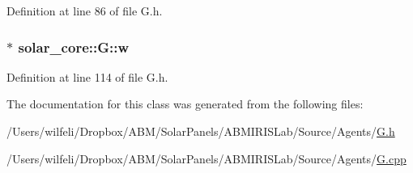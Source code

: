 Definition at line 86 of file G.\+h.

\hypertarget{classsolar__core_1_1_g_a7239d05d617261f97c46b641a0229c14}{}
\subsubsection[{w}]{$\ast$ solar\+\_\+core\+::\+G\+::w\hspace{0.3cm}{\ttfamily [protected]}}\label{classsolar__core_1_1_g_a7239d05d617261f97c46b641a0229c14}


Definition at line 114 of file G.\+h.



The documentation for this class was generated from the following files\+:\begin{DoxyCompactItemize}
\item 
/\+Users/wilfeli/\+Dropbox/\+A\+B\+M/\+Solar\+Panels/\+A\+B\+M\+I\+R\+I\+S\+Lab/\+Source/\+Agents/\hyperlink{_g_8h}{G.\+h}\item 
/\+Users/wilfeli/\+Dropbox/\+A\+B\+M/\+Solar\+Panels/\+A\+B\+M\+I\+R\+I\+S\+Lab/\+Source/\+Agents/\hyperlink{_g_8cpp}{G.\+cpp}\end{DoxyCompactItemize}
